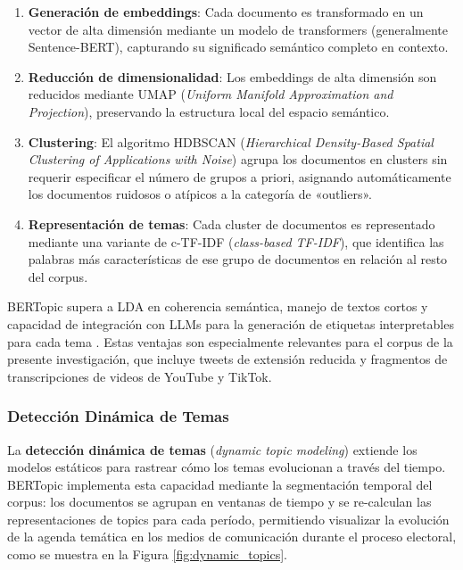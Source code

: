 \begin{enumerate}
    \item \textbf{Generación de embeddings}: Cada documento es transformado en un vector de alta dimensión mediante un modelo de transformers (generalmente Sentence-BERT), capturando su significado semántico completo en contexto.
    \item \textbf{Reducción de dimensionalidad}: Los embeddings de alta dimensión son reducidos mediante UMAP (\textit{Uniform Manifold Approximation and Projection}), preservando la estructura local del espacio semántico.
    \item \textbf{Clustering}: El algoritmo HDBSCAN (\textit{Hierarchical Density-Based Spatial Clustering of Applications with Noise}) agrupa los documentos en clusters sin requerir especificar el número de grupos a priori, asignando automáticamente los documentos ruidosos o atípicos a la categoría de «outliers».
    \item \textbf{Representación de temas}: Cada cluster de documentos es representado mediante una variante de c-TF-IDF (\textit{class-based TF-IDF}), que identifica las palabras más características de ese grupo de documentos en relación al resto del corpus.
\end{enumerate}

BERTopic supera a LDA en coherencia semántica, manejo de textos cortos y capacidad de integración con LLMs para la generación de etiquetas interpretables para cada tema \parencite{tec_grootendorst2022bertopic}. Estas ventajas son especialmente relevantes para el corpus de la presente investigación, que incluye tweets de extensión reducida y fragmentos de transcripciones de videos de YouTube y TikTok.

\subsubsection{Detección Dinámica de Temas}

La \textbf{detección dinámica de temas} (\textit{dynamic topic modeling}) extiende los modelos estáticos para rastrear cómo los temas evolucionan a través del tiempo. BERTopic implementa esta capacidad mediante la segmentación temporal del corpus: los documentos se agrupan en ventanas de tiempo y se re-calculan las representaciones de topics para cada período, permitiendo visualizar la evolución de la agenda temática en los medios de comunicación durante el proceso electoral, como se muestra en la Figura \ref{fig:dynamic_topics}.

